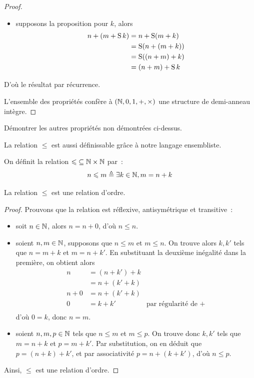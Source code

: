 \begin{proof}
\begin{itemize}
\begin{itemize}
      l'égalité.
    \item supposons la proposition pour $k$, alors
      \begin{align*}
        n+(m+\operatorname{S} k) &= n + \operatorname{S} (m + k)\\
        &= \operatorname{S}(n+(m+k))\\
        &= \operatorname{S}((n+m)+k)\\
        &= (n+m)+\operatorname{S} k
      \end{align*}
    \end{itemize}
    D'où le résultat par récurrence.
  \end{itemize}
  L'ensemble des propriétés confère à $(\mathbb N,0,1,+,\times)$ une structure
  de demi-anneau intègre.
\end{proof}

\begin{exercise}
  Démontrer les autres propriétés non démontrées ci-dessus.
\end{exercise}

\noindent
La relation $\leq$ est aussi définissable grâce à notre langage ensembliste.

\begin{definition}[Inégalité]
  On définit la relation $\mathord{\leqslant}\subseteq \mathbb N \times \mathbb N$
  par~:
  \[n \leqslant m \triangleq \exists k \in \mathbb N, m = n + k\]
\end{definition}

\begin{property}
  La relation $\leq$ est une relation d'ordre.
\end{property}

\begin{proof}
  Prouvons que la relation est réflexive, antisymétrique et transitive~:
  \begin{itemize}
  \item soit $n\in \mathbb N$, alors $n = n + 0$, d'où $n\leq n$.
  \item soient $n,m\in \mathbb N$, supposons que $n \leq m$ et $m \leq n$. On
    trouve alors $k,k'$ tels que $n = m + k$ et $m = n + k'$. En substituant
    la deuxième inégalité dans la première, on obtient alors
    \begin{align*}
      n &= (n + k') + k\\
      &= n + (k' + k)\\
      n + 0 &= n + (k' + k)\\
      0 &= k + k'&\text{par régularité de }+\\
    \end{align*}
    d'où $0 = k$, donc $n = m$.
  \item soient $n,m,p\in \mathbb N$ tels que $n\leq m$ et $m\leq p$. On trouve
    donc $k,k'$ tels que $m = n + k$ et $p = m + k'$. Par substitution, on en
    déduit que $p = (n + k) + k'$, et par associativité $p = n + (k + k')$, d'où
    $n \leq p$.
  \end{itemize}
  Ainsi, $\leq$ est une relation d'ordre.
\end{proof}

